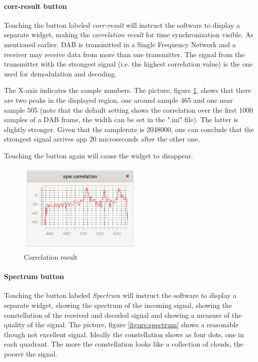 \documentclass[12pt]{article}
\begin{document}
\paragraph{corr-result button}
Touching the button labeled {\em corr-result} will instruct
the software to display a separate widget, making
the {\em correlation result} for time synchronization visible.
As mentioned earlier,
DAB is transmitted in a Single Frequency Network and a receiver may
receive data from more than one transmitter. The signal from
the transmitter with the strongest signal (i.e. the highest correlation
value) is the  one used for demodulation and decoding.
\par
The X-axis indicates the sample numbers.
The picture, figure \ref{figure:correlation-result}, shows that there
are two peaks in the displayed region, one around sample 465 and one
near sample 505 (note that the default setting shows the correlation
over the first 1000 samples of a DAB frame, the width can be set in the ".ini"
file).
The latter is slightly stronger.
Given that the samplerate is 2048000, one can conclude that
the strongest signal arrives app 20 microseconds after the other one.
\par
Touching the button again will cause the widget to disappear.
\begin{figure}[htp]
\centering
\includegraphics[width=60mm]{qt-dab-correlation-button.png}
\caption{Correlation result}
\label{figure:correlation-result}
\end{figure}

\paragraph{Spectrum button}
Touching the button labeled {\em Spectrum} will instruct
the software to display a separate widget, showing
the spectrum of the incoming signal, showing the constellation of the
received and decoded signal and showing a measure of the quality of the
signal.
The picture, figure \ref{figure:spectrum} shows a reasonable
though not excellent signal.
Ideally the constellation shows as four dots,
one in each quadrant. The more the constellation looks like a
collection of clouds,
the poorer the signal.
\end{document}
